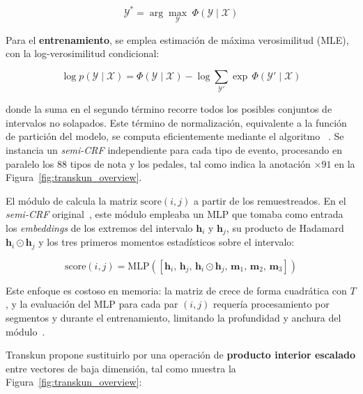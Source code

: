 \documentclass[11pt,spanish,listoffigures,listoftables]{tfgetsinf}
\begin{document}
\begin{equation}
  \mathcal{Y}^* = \arg\max_{\mathcal{Y}}\; \Phi(\mathcal{Y} \mid \mathcal{X})
  \label{eq:semicrf_map}
\end{equation}

Para el \textbf{entrenamiento}, se emplea estimación de máxima verosimilitud
(MLE), con la log-verosimilitud condicional:

\begin{equation}
  \log p(\mathcal{Y} \mid \mathcal{X}) =
  \Phi(\mathcal{Y} \mid \mathcal{X}) -
  \log \sum_{\mathcal{Y}'} \exp\,\Phi(\mathcal{Y}' \mid \mathcal{X})
  \label{eq:semicrf_mle}
\end{equation}

\noindent donde la suma en el segundo término recorre todos los posibles conjuntos
de intervalos no solapados. Este término de normalización, equivalente a la función
de partición del modelo, se computa eficientemente mediante el algoritmo
~\cite{yan2021semicrf1}. Se instancia un
\textit{semi-CRF} independiente para cada tipo de evento, procesando en paralelo los 88
tipos de nota y los pedales, tal como indica la anotación $\times 91$ en la
Figura~\ref{fig:transkun_overview}.


El módulo de  calcula la matriz $\text{score}(i, j)$
a partir de los  remuestreados. En el \textit{semi-CRF}
original~\cite{yan2021semicrf1}, este módulo empleaba un MLP que tomaba como
entrada los \textit{embeddings} de los extremos del intervalo
$\boldsymbol{h}_i$ y $\boldsymbol{h}_j$, su producto de Hadamard
$\boldsymbol{h}_i \odot \boldsymbol{h}_j$ y los tres primeros momentos
estadísticos sobre el intervalo:

\begin{equation}
  \text{score}(i, j) = \text{MLP}([\boldsymbol{h}_i,\, \boldsymbol{h}_j,\,
  \boldsymbol{h}_i \odot \boldsymbol{h}_j,\, \boldsymbol{m}_1,\,
  \boldsymbol{m}_2,\, \boldsymbol{m}_3])
  \label{eq:scoring_mlp}
\end{equation}

Este enfoque es costoso en memoria: la matriz de  crece
de forma cuadrática con $T$, y la evaluación del MLP para cada par $(i, j)$ requería
procesamiento por segmentos y  durante el
entrenamiento, limitando la profundidad y anchura del módulo~\cite{yan2024transkun}.

Transkun propone sustituirlo por una operación de \textbf{producto interior
escalado} entre vectores de baja dimensión, tal como muestra la
Figura~\ref{fig:transkun_overview}:
\end{document}
